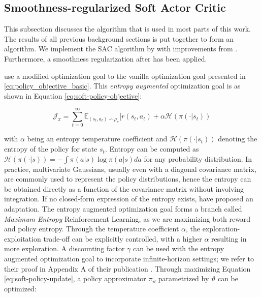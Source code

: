 \subsection{Smoothness-regularized Soft Actor Critic}
\label{section:background-sac}

\begin{summary}
This subsection discusses the algorithm that is used in most parts of this work. The results of all previous background sections is put together to form an algorithm. We implement the \acf{SAC} algorithm by \citet{haarnojaSoftActorCriticOffPolicy2018} with improvements from \citet{haarnojaSoftActorCriticAlgorithms2019}. Furthermore, a smoothness regularization after \citet{mysoreRegularizingActionPolicies2021} has been applied. 
\end{summary}

\citet[Equation 1]{haarnojaSoftActorCriticOffPolicy2018} use a modified optimization goal to the vanilla optimization goal presented in \ref{eq:policy_objective_basic}. This \textit{entropy augmented} optimization goal is as shown in Equation \ref{eq:soft-policy-objective}:

\begin{equation}
\label{eq:soft-policy-objective}
\mathcal{J}_{\pi} = \sum_{t=0}^{\infty} \mathbb{E}_{(s_t, a_t) \backsim \rho_{\pi}} [r(s_t, a_t) + \alpha \mathcal{H}(\pi(\cdot|s_t))
\end{equation}

with $\alpha$ being an entropy temperature coefficient and $\mathcal{H}(\pi(\cdot|s_t))$ denoting the entropy of the policy for state $s_t$. Entropy can be computed as $\mathcal{H}(\pi(\cdot|s)) = - \int \pi(a | s) \log \pi(a | s) da$ for any probability distribution. In practice, multivariate Gaussians, usually even with a diagonal covariance matrix, are commonly used to represent the policy distributions, hence the entropy can be obtained directly as a function of the covariance matrix without involving integration. If no closed-form expression of the entropy exists, \citet{haarnojaReinforcementLearningDeep2017} have proposed an adaptation. The entropy augmented optimization goal forms a branch called \textit{Maximum Entropy} Reinforcement Learning, as we are maximizing both reward and policy entropy. Through the temperature coefficient $\alpha$, the exploration-exploitation trade-off can be explicitly controlled, with a higher $\alpha$ resulting in more exploration. A discounting factor $\gamma$ can be used with the entropy augmented optimization goal to incorporate infinite-horizon settings; we refer to their proof in Appendix A of their publication \cite[Appendix A]{haarnojaSoftActorCriticOffPolicy2018}. Through maximizing Equation \ref{eq:soft-policy-update}, a policy approximator $\pi_{\vartheta}$ parametrized by $\vartheta$ can be optimized:

